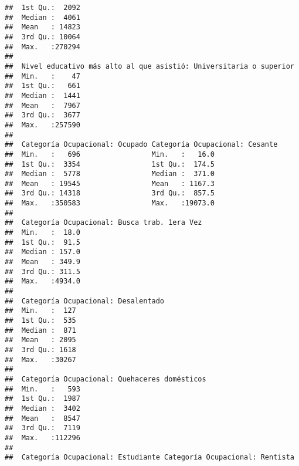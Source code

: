 \documentclass[11pt,]{article}
\begin{document}
\begin{verbatim}
##  1st Qu.:  2092                                             
##  Median :  4061                                             
##  Mean   : 14823                                             
##  3rd Qu.: 10064                                             
##  Max.   :270294                                             
##                                                             
##  Nivel educativo más alto al que asistió: Universitaria o superior
##  Min.   :    47                                                   
##  1st Qu.:   661                                                   
##  Median :  1441                                                   
##  Mean   :  7967                                                   
##  3rd Qu.:  3677                                                   
##  Max.   :257590                                                   
##                                                                   
##  Categoría Ocupacional: Ocupado Categoría Ocupacional: Cesante
##  Min.   :   696                 Min.   :   16.0               
##  1st Qu.:  3354                 1st Qu.:  174.5               
##  Median :  5778                 Median :  371.0               
##  Mean   : 19545                 Mean   : 1167.3               
##  3rd Qu.: 14318                 3rd Qu.:  857.5               
##  Max.   :350583                 Max.   :19073.0               
##                                                               
##  Categoría Ocupacional: Busca trab. 1era Vez
##  Min.   :  18.0                             
##  1st Qu.:  91.5                             
##  Median : 157.0                             
##  Mean   : 349.9                             
##  3rd Qu.: 311.5                             
##  Max.   :4934.0                             
##                                             
##  Categoría Ocupacional: Desalentado
##  Min.   :  127                     
##  1st Qu.:  535                     
##  Median :  871                     
##  Mean   : 2095                     
##  3rd Qu.: 1618                     
##  Max.   :30267                     
##                                    
##  Categoría Ocupacional: Quehaceres domésticos
##  Min.   :   593                              
##  1st Qu.:  1987                              
##  Median :  3402                              
##  Mean   :  8547                              
##  3rd Qu.:  7119                              
##  Max.   :112296                              
##                                              
##  Categoría Ocupacional: Estudiante Categoría Ocupacional: Rentista

\end{verbatim}
\end{document}
